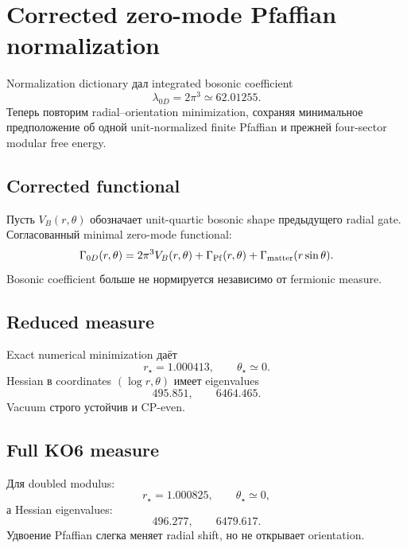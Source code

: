 \chapter{Corrected zero-mode Pfaffian normalization}

Normalization dictionary дал integrated bosonic coefficient
\begin{equation}
 \lambda_{0D}=2\pi^3\simeq62.01255.
\end{equation}
Теперь повторим radial--orientation minimization, сохраняя минимальное
предположение об одной unit-normalized finite Pfaffian и прежней
four-sector modular free energy.

\section{Corrected functional}

Пусть $V_B(r,\theta)$ обозначает unit-quartic bosonic shape предыдущего
radial gate. Согласованный minimal zero-mode functional:
\begin{equation}
 \Gamma_{0D}(r,\theta)
 =
 2\pi^3V_B(r,\theta)
 +\Gamma_{\rm Pf}(r,\theta)
 +\Gamma_{\rm matter}(r\sin\theta).
\end{equation}
Bosonic coefficient больше не нормируется независимо от fermionic measure.

\section{Reduced measure}

Exact numerical minimization даёт
\begin{equation}
 r_\star=1.000413,
 \qquad
 \theta_\star\simeq0.
\end{equation}
Hessian в coordinates $(\log r,\theta)$ имеет eigenvalues
\begin{equation}
 495.851,\qquad6464.465.
\end{equation}
Vacuum строго устойчив и CP-even.

\section{Full KO6 measure}

Для doubled modulus:
\begin{equation}
 r_\star=1.000825,
 \qquad
 \theta_\star\simeq0,
\end{equation}
а Hessian eigenvalues:
\begin{equation}
 496.277,\qquad6479.617.
\end{equation}
Удвоение Pfaffian слегка меняет radial shift, но не открывает orientation.

